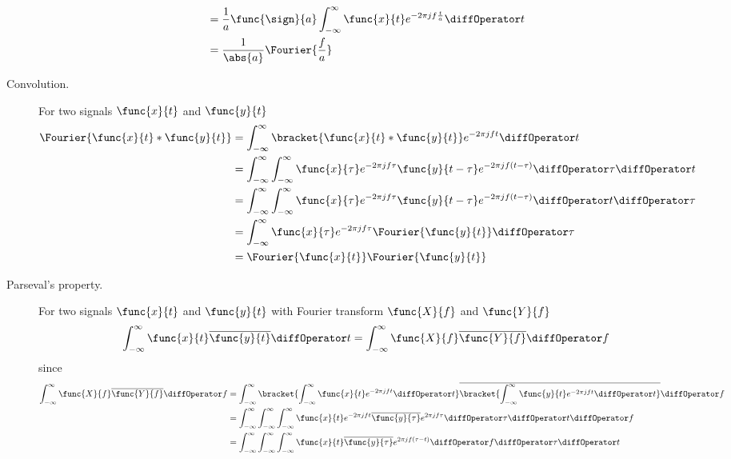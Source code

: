 \begin{description}
\begin{align*}
        &= \dfrac{1}{a} \func{\sign}{a} \int_{-\infty}^{\infty} \func{x}{t} e^{-2 \pi j f \frac{t}{a}} \diffOperator t \\
        &= \dfrac{1}{\abs{a}} \Fourier{\frac{f}{a}}
    \end{align*}
    \item [Convolution.] For two signals \(\func{x}{t}\) and \(\func{y}{t}\)
    \begin{align*}
        \Fourier{\func{x}{t} \ast \func{y}{t}} &= \int_{-\infty}^{\infty} \bracket{\func{x}{t} \ast \func{y}{t}} e^{-2 \pi j f t} \diffOperator t\\
        &= \int_{-\infty}^{\infty} \int_{-\infty}^{\infty} \func{x}{\tau}e^{-2 \pi j f \tau} \func{y}{t- \tau}  e^{-2 \pi j f (t -\tau)} \diffOperator \tau \diffOperator t\\
        &= \int_{-\infty}^{\infty} \int_{-\infty}^{\infty} \func{x}{\tau}e^{-2 \pi j f \tau} \func{y}{t- \tau}  e^{-2 \pi j f (t -\tau)}\diffOperator t \diffOperator \tau \\
        &= \int_{-\infty}^{\infty}  \func{x}{\tau}e^{-2 \pi j f \tau}  \Fourier{\func{y}{t}} \diffOperator \tau\\
        &= \Fourier{\func{x}{t}} \Fourier{\func{y}{t}}
    \end{align*}
    \item [Parseval's property.]  For two signals \(\func{x}{t}\) and \(\func{y}{t}\) with Fourier transform \(\func{X}{f}\) and \(\func{Y}{f}\)
    \begin{equation*}
        \int_{-\infty}^{\infty} \func{x}{t} \overline{\func{y}{t}} \diffOperator t = \int_{-\infty}^{\infty} \func{X}{f} \overline{\func{Y}{f}} \diffOperator f
    \end{equation*}
    since 
    \begin{align*}
        \int_{-\infty}^{\infty} \func{X}{f} \overline{\func{Y}{f}} \diffOperator f &= \int_{-\infty}^{\infty} \bracket{\int_{-\infty}^{\infty} \func{x}{t} e^{-2\pi j f t} \diffOperator t} \overline{\bracket{\int_{-\infty}^{\infty} \func{y}{t} e^{-2\pi j f t} \diffOperator t} } \diffOperator f \\
        &= \int_{-\infty}^{\infty} \int_{-\infty}^{\infty} \int_{-\infty}^{\infty}  \func{x}{t} e^{-2\pi j f t} \overline{\func{y}{\tau}} e^{2\pi j f \tau} \diffOperator \tau \diffOperator t \diffOperator f\\
        &= \int_{-\infty}^{\infty} \int_{-\infty}^{\infty} \int_{-\infty}^{\infty}  \func{x}{t} \overline{\func{y}{\tau}} e^{2\pi j f (\tau - t)} \diffOperator f \diffOperator \tau \diffOperator t\\

\end{align*}
\end{description}
